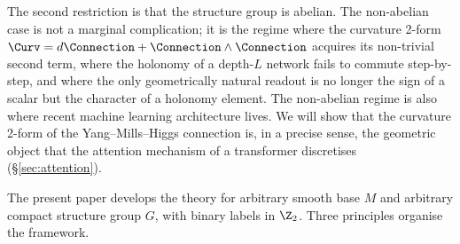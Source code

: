 The second restriction is that the structure group is abelian. The
non-abelian case is not a marginal complication; it is the regime where
the curvature 2-form $\Curv = d\Connection + \Connection\wedge \Connection$
acquires its non-trivial second term, where the holonomy of a depth-$L$
network fails to commute step-by-step, and where the only
geometrically natural readout is no longer the sign of a scalar but the
character of a holonomy element. The non-abelian regime is also where
recent machine learning architecture lives. We will show that the
curvature 2-form of the Yang--Mills--Higgs connection is, in a precise
sense, the geometric object that the attention mechanism of a
transformer discretises (\S\ref{sec:attention}).

The present paper develops the theory for arbitrary smooth base $M$
and arbitrary compact structure group $G$, with binary labels in
$\Z_2$. Three principles organise the framework.


